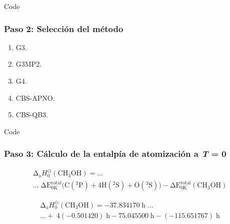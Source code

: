 \documentclass{beamer}
\begin{document}
\begin{frame}[fragile]{Code}
\frametitle{Paso 2: Selección del método}

\begin{enumerate}		
	\item G3. 
	\item G3MP2.
	\item G4.	
	\item CBS-APNO.
	\item CBS-QB3.
\end{enumerate}
\end{frame}

\begin{frame}[fragile]{Code}
\frametitle{Paso 3: Cálculo de la entalpía de atomización a \textit{T} = 0}

\begin{multline}
	\mathrm{\Delta}_\mathrm{{a}} H^{\circleddash}_{\mathrm{0}}\mathrm{(CH_3OH)}  = ... \\ ...\; \mathrm{\Delta} \mathrm{E^{total}_{0K}} \mathrm{(C(^{3}P)} + \mathrm{4H(^{2}S)} + \mathrm{O(^{3}S))}- \mathrm{\Delta E^{total}_{0K} (CH_{3}OH)}
\label{eq:4.1}
\end{multline}

\begin{multline}
	\mathrm{\Delta}_\mathrm{{a}} H^{\circleddash}_{0}\mathrm{(CH_3OH)} = \mathrm{-37.834170\;h} \;... \\ ...+\;\mathrm{4(-0.501420)}\;\mathrm{h - 75.045500}\;\mathrm{h -(-115.651767)\;h}
\label{eq:4.2}
\end{multline}
\end{frame}
\end{document}
